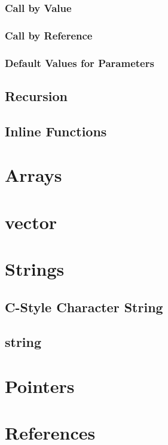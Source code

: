 \documentclass[10pt,a4paper]{scrartcl}
\begin{document}
\begin{multicols*}{2}
\subsubsection{Call by Value}

\subsubsection{Call by Reference}

\subsubsection{Default Values for Parameters}

\subsection{Recursion}

\subsection{Inline Functions}

\section{Arrays}

\section{vector}

\section{Strings}

\subsection{C-Style Character String}

\subsection{string}

\section{Pointers}

\section{References}


\end{multicols*}
\end{document}
